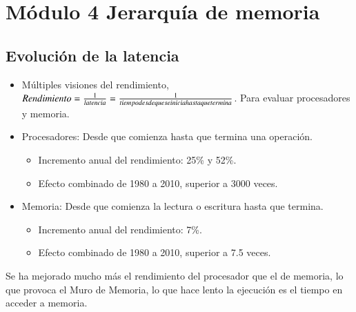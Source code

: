 \documentclass[12pt, twoside, openright]{report} %
\begin{document}
\chapter{Módulo 4 Jerarquía de memoria}
\section{Evolución de la latencia}

\begin{itemize}

	\item Múltiples visiones del rendimiento,
	      \(Rendimiento =\frac 1 {latencia}= \frac 1 {tiempo\space desde\space que\space se\space inicia\space hasta\space que\space termina}\).
	      Para evaluar procesadores y memoria.
	\item Procesadores: Desde que comienza hasta que termina una operación.

	      \begin{itemize}

		      \item Incremento anual del rendimiento: 25\% y 52\%.
		      \item Efecto combinado de 1980 a 2010, superior a 3000 veces.
	      \end{itemize}
	\item Memoria: Desde que comienza la lectura o escritura hasta que
	      termina.

	      \begin{itemize}

		      \item Incremento anual del rendimiento: 7\%.
		      \item Efecto combinado de 1980 a 2010, superior a 7.5 veces.
	      \end{itemize}
\end{itemize}

Se ha mejorado mucho más el rendimiento del procesador que el de
memoria, lo que provoca el Muro de Memoria, lo que hace lento la
ejecución es el tiempo en acceder a memoria.
\end{document}
